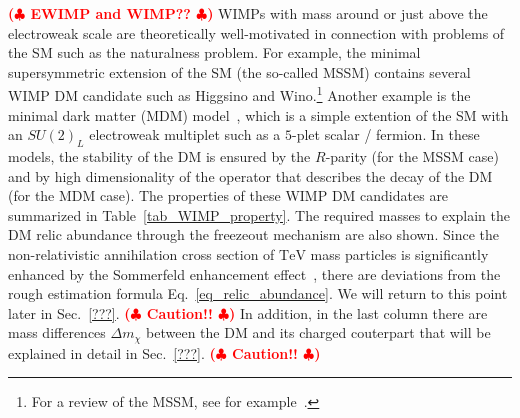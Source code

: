 \documentclass[12pt,twoside,book]{article}
\def\rem#1{ {\bf\textcolor{red}{($\clubsuit$ #1 $\clubsuit$)}}}
\begin{document}
\rem{EWIMP and WIMP??}
WIMPs with mass around or just above the electroweak scale are
theoretically well-motivated in connection with problems of the SM such
as the naturalness problem.  For example, the minimal supersymmetric
extension of the SM (the so-called MSSM) contains several WIMP DM
candidate such as Higgsino and Wino.\footnote{
For a review of the MSSM, see for example~\cite{Martin:1997ns}.
}
Another example is the minimal dark matter (MDM)
model~\cite{Cirelli:2005uq, Cirelli:2007xd, Cirelli:2009uv}, which is a
simple extention of the SM with an $SU(2)_L$ electroweak multiplet such
as a $5$-plet scalar / fermion.  In these models, the stability of the
DM is ensured by the $R$-parity (for the MSSM case) and by high
dimensionality of the operator that describes the decay of the DM (for
the MDM case).  The properties of these WIMP DM candidates are
summarized in Table~\ref{tab_WIMP_property}.  The required masses to
explain the DM relic abundance through the freezeout mechanism are also
shown.  Since the non-relativistic annihilation cross section of
$\mathrm{TeV}$ mass particles is significantly enhanced by the
Sommerfeld enhancement effect~\cite{Hisano:2004ds, Hisano:2006nn}, there
are deviations from the rough estimation formula
Eq.~\eqref{eq_relic_abundance}.  We will return to this point later in
Sec.~\ref{???}.  \rem{Caution!!}  In addition, in the last column there
are mass differences $\Delta m_\chi$ between the DM and its charged
couterpart that will be explained in detail in Sec.~\ref{???}.
\rem{Caution!!}

\begin{appendices}
 
\end{appendices}

\clearpage



\end{document}
